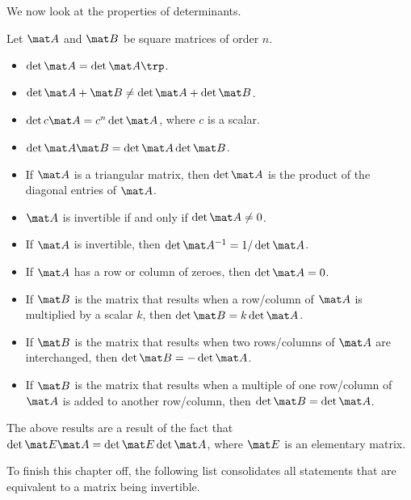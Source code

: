 We now look at the properties of determinants.

\begin{fact}
    Let $\mat A$ and $\mat B$ be square matrices of order $n$.
    \begin{itemize}
        \item $\det{\mat A} = \det{\mat A \trp}$.
        \item $\det{\mat A + \mat B} \neq \det{\mat A} + \det{\mat B}$.
        \item $\det{c \mat A} = c^n \det{\mat A}$, where $c$ is a scalar.
        \item $\det{\mat A \mat B} = \det{\mat A} \det{\mat B}$.
        \item If $\mat A$ is a triangular matrix, then $\det{\mat A}$ is the product of the diagonal entries of $\mat A$.
        \item $\mat A$ is invertible if and only if $\det{\mat A} \neq 0$.
        \item If $\mat A$ is invertible, then $\det{\mat A^{-1}} = 1/\det{\mat A}$.
        \item If $\mat A$ has a row or column of zeroes, then $\det{\mat A} = 0$.
    \end{itemize}
\end{fact}

\begin{fact}
    \phantom{.}
    \begin{itemize}
        \item If $\mat B$ is the matrix that results when a row/column of $\mat A$ is multiplied by a scalar $k$, then $\det{\mat B} = k \det{\mat A}$.
        \item If $\mat B$ is the matrix that results when two rows/columns of $\mat A$ are interchanged, then $\det{\mat B} = -\det{\mat A}$.
        \item If $\mat B$ is the matrix that results when a multiple of one row/column of $\mat A$ is added to another row/column, then $\det{\mat B} = \det{\mat A}$.
    \end{itemize}
\end{fact}

The above results are a result of the fact that $\det{\mat E \mat A} = \det{\mat E}\det{\mat A}$, where $\mat E$ is an elementary matrix.

To finish this chapter off, the following list consolidates all statements that are equivalent to a matrix being invertible. 

